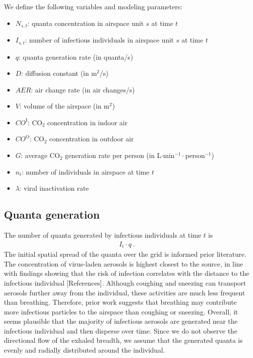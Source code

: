 \documentclass[fleqn,11pt]{wlscirep_supp}
\begin{document}
We define the following variables and modeling parameters:
\begin{itemize}
    \item $N_{s,t}$: quanta concentration in airspace unit $s$ at time $t$
    \item $I_{s,t}$: number of infectious individuals in airspace unit $s$ at time $t$
    \item $q$: quanta generation rate (in quanta/s)
    \item $D$: diffusion constant (in m$^2$/s)
    \item $AER$: air change rate (in air changes/s)
    \item $V$: volume of the airspace (in m$^2$)
    \item $CO^{\text{I}}$: CO$_2$ concentration in indoor air
    \item $CO^{\text{O}}$: CO$_2$ concentration in outdoor air
    \item $G$: average CO$_2$ generation rate per person (in L$\cdot$min$^{-1}\cdot$person$^{-1}$)
    \item $n_t$: number of individuals in airspace at time $t$
    \item $\lambda$: viral inactivation rate
\end{itemize}

\subsection{Quanta generation}\label{sec:quanta-generation}

The number of quanta generated by infectious individuals at time $t$ is 
\begin{align}\label{eq:generation}
    I_t \cdot q ~.
\end{align}
The initial spatial spread of the quanta over the grid is informed prior literature. The concentration of virus-laden aerosols is highest closest to the source\cite{Vuorinen2020SafSci,Chen2020BuildEnv}, in line with findings showing that the risk of infection correlates with the distance to the infectious individual [References]. Although coughing and sneezing can transport aerosols further away from the individual, these activities are much less frequent than breathing. Therefore, prior work suggests that breathing may contribute more infectious particles to the airspace than coughing or sneezing\cite{Dinkele2022AJRCCM}. Overall, it seems plausible that the majority of infectious aerosols are generated near the infectious individual and then disperse over time. Since we do not observe the directional flow of the exhaled breadth, we assume that the generated quanta is evenly and radially distributed around the individual. 
\end{document}
